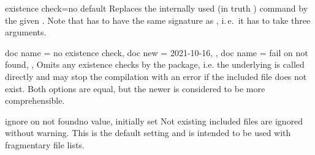\documentclass[a4paper,11pt]{ltxdoc}
\begin{document}
\begin{docIgrKey}{existence check}{=}{no default}
  Replaces the internally used 
  (in truth )
  command by the given .
  Note that  has to have the same signature as ,
  i.\,e.\ it has to take three arguments.
\end{docIgrKey}

\begin{docIgrKeys}[
    doc parameter   = {},
    doc description = {no value}
  ]
  {
    {
      doc name = no existence check,
      doc new  = 2021-10-16,
    },
    {
      doc name = fail on not found,
    },
  }
  Omits any existence checks by the package, i.e. the underlying
   is called directly and may
  stop the compilation with an error if the included file does not exist.
  Both options are equal, but the newer 
  is considered to be more comprehensible.
\end{docIgrKeys}

\begin{docIgrKey}{ignore on not found}{}{no value, initially set}
  Not existing included files are ignored without warning. This is the default
  setting and is intended to be used with fragmentary file lists.
\end{docIgrKey}

\clearpage
\end{document}
